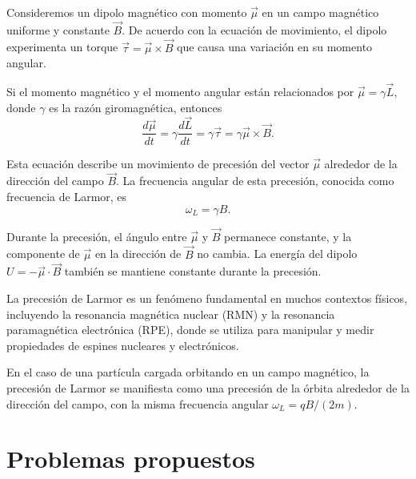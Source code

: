\documentclass[12pt,a4paper]{book}
\begin{document}
Consideremos un dipolo magnético con momento $\vec{\mu}$ en un campo magnético uniforme y constante $\vec{B}$. De acuerdo con la ecuación de movimiento, el dipolo experimenta un torque $\vec{\tau} = \vec{\mu} \times \vec{B}$ que causa una variación en su momento angular.

Si el momento magnético y el momento angular están relacionados por $\vec{\mu} = \gamma \vec{L}$, donde $\gamma$ es la razón giromagnética, entonces
\begin{equation}
\frac{d\vec{\mu}}{dt} = \gamma \frac{d\vec{L}}{dt} = \gamma \vec{\tau} = \gamma \vec{\mu} \times \vec{B}.
\end{equation}

Esta ecuación describe un movimiento de precesión del vector $\vec{\mu}$ alrededor de la dirección del campo $\vec{B}$. La frecuencia angular de esta precesión, conocida como frecuencia de Larmor, es
\begin{equation}
\omega_L = \gamma B.
\end{equation}

Durante la precesión, el ángulo entre $\vec{\mu}$ y $\vec{B}$ permanece constante, y la componente de $\vec{\mu}$ en la dirección de $\vec{B}$ no cambia. La energía del dipolo $U = -\vec{\mu} \cdot \vec{B}$ también se mantiene constante durante la precesión.

La precesión de Larmor es un fenómeno fundamental en muchos contextos físicos, incluyendo la resonancia magnética nuclear (RMN) y la resonancia paramagnética electrónica (RPE), donde se utiliza para manipular y medir propiedades de espines nucleares y electrónicos.

En el caso de una partícula cargada orbitando en un campo magnético, la precesión de Larmor se manifiesta como una precesión de la órbita alrededor de la dirección del campo, con la misma frecuencia angular $\omega_L = qB/(2m)$.

\section{Problemas propuestos}
\end{document}
